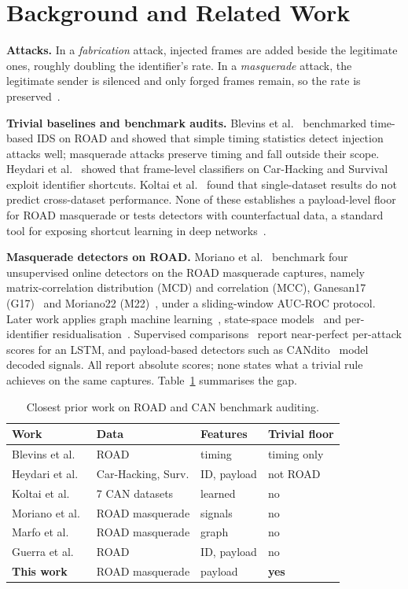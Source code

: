 \documentclass[conference]{IEEEtran}
\begin{document}
\section{Background and Related Work}
\textbf{Attacks.} In a \emph{fabrication} attack, injected frames are added beside the legitimate ones, roughly doubling the identifier's rate. In a \emph{masquerade} attack, the legitimate sender is silenced and only forged frames remain, so the rate is preserved~\cite{verma2024}.

\textbf{Trivial baselines and benchmark audits.} Blevins et al.~\cite{blevins2021} benchmarked time-based IDS on ROAD and showed that simple timing statistics detect injection attacks well; masquerade attacks preserve timing and fall outside their scope. Heydari et al.~\cite{heydari2026} showed that frame-level classifiers on Car-Hacking and Survival exploit identifier shortcuts. Koltai et al.~\cite{koltai2026} found that single-dataset results do not predict cross-dataset performance. None of these establishes a payload-level floor for ROAD masquerade or tests detectors with counterfactual data, a standard tool for exposing shortcut learning in deep networks~\cite{geirhos2020}.

\textbf{Masquerade detectors on ROAD.} Moriano et al.~\cite{moriano2026jisa} benchmark four unsupervised online detectors on the ROAD masquerade captures, namely matrix-correlation distribution (MCD) and correlation (MCC), Ganesan17 (G17)~\cite{ganesan2017} and Moriano22 (M22)~\cite{moriano2022}, under a sliding-window AUC-ROC protocol. Later work applies graph machine learning~\cite{marfo2025}, state-space models~\cite{liu2026mids} and per-identifier residualisation~\cite{hegde2026}. Supervised comparisons~\cite{guerra2024} report near-perfect per-attack scores for an LSTM, and payload-based detectors such as CANdito~\cite{longari2022} model decoded signals. All report absolute scores; none states what a trivial rule achieves on the same captures. Table~\ref{tab:related} summarises the gap.

\begin{table}[t]
\centering
\caption{Closest prior work on ROAD and CAN benchmark auditing.}
\label{tab:related}
\footnotesize
\setlength{\tabcolsep}{3pt}
\begin{tabular}{@{}llll@{}}
\toprule
Work & Data & Features & Trivial floor \\
\midrule
Blevins et al.~\cite{blevins2021} & ROAD & timing & timing only \\
Heydari et al.~\cite{heydari2026} & Car-Hacking, Surv. & ID, payload & not ROAD \\
Koltai et al.~\cite{koltai2026} & 7 CAN datasets & learned & no \\
Moriano et al.~\cite{moriano2026jisa} & ROAD masquerade & signals & no \\
Marfo et al.~\cite{marfo2025} & ROAD masquerade & graph & no \\
Guerra et al.~\cite{guerra2024} & ROAD & ID, payload & no \\
\textbf{This work} & ROAD masquerade & payload & \textbf{yes} \\
\bottomrule
\end{tabular}
\end{table}
\end{document}
